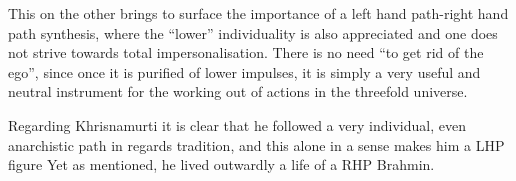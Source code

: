\begin{footnotesize}
\begin{sffamily}
This on the other brings to surface the importance of a left hand path-right hand path synthesis, where the ``lower'' individuality is also appreciated and one does not strive towards total impersonalisation. There is no need ``to get rid of the ego'', since once it is purified of lower impulses, it is simply a very useful and neutral instrument for the working out of actions in the threefold universe.

Regarding Khrisnamurti it is clear that he followed a very individual, even anarchistic path in regards tradition, and this alone in a sense makes him a LHP figure Yet as mentioned, he lived outwardly a life of a RHP Brahmin.

\end{sffamily}
\end{footnotesize}

